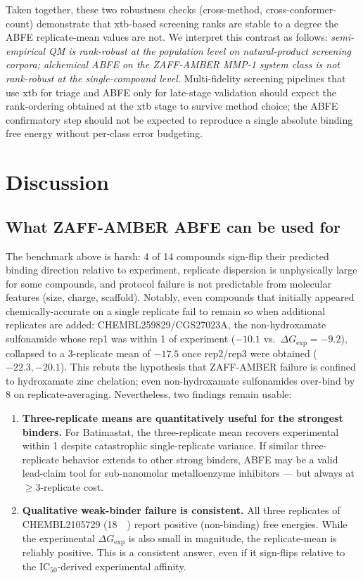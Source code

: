 \documentclass[11pt,a4paper]{article}
\newcommand{\dG}{\Delta G}
\newcommand{\dGexp}{\dG_{\mathrm{exp}}}
\newcommand{\kcalmol}{\mathrm{kcal\,mol^{-1}}}
\begin{document}
Taken together, these two robustness checks (cross-method, cross-conformer-count)
demonstrate that xtb-based screening ranks are stable to a degree the
ABFE replicate-mean values are not. We interpret this contrast as
follows: \emph{semi-empirical QM is rank-robust at the population
level on natural-product screening corpora; alchemical ABFE on the
ZAFF-AMBER MMP-1 system class is not rank-robust at the single-compound
level.} Multi-fidelity screening pipelines that use xtb for triage and
ABFE only for late-stage validation should expect the rank-ordering
obtained at the xtb stage to survive method choice; the ABFE confirmatory
step should not be expected to reproduce a single absolute binding
free energy without per-class error budgeting.

\section{Discussion}
\label{sec:discussion}

\subsection{What ZAFF-AMBER ABFE can be used for}

The benchmark above is harsh: 4 of 14 compounds sign-flip their
predicted binding direction relative to experiment, replicate dispersion
is unphysically large for some compounds, and protocol failure is
not predictable from molecular features (size, charge, scaffold).
Notably, even compounds that initially appeared chemically-accurate
on a single replicate fail to remain so when additional replicates
are added: CHEMBL259829/CGS27023A, the non-hydroxamate sulfonamide
whose rep1 was within \SI{1}{\kcalmol} of experiment
($-10.1$ vs.\ $\dGexp = -9.2$), collapsed to a 3-replicate mean of
$-17.5$ once rep2/rep3 were obtained ($-22.3, -20.1$). This rebuts
the hypothesis that ZAFF-AMBER failure is confined to hydroxamate
zinc chelation; even non-hydroxamate sulfonamides over-bind by
\SI{8}{\kcalmol} on replicate-averaging. Nevertheless, two findings
remain usable:

\begin{enumerate}[leftmargin=*]
  \item \textbf{Three-replicate means are quantitatively useful for the
    strongest binders.} For Batimastat, the three-replicate mean
    recovers experimental within \SI{1}{\kcalmol} despite catastrophic
    single-replicate variance. If similar three-replicate behavior
    extends to other strong binders, ABFE may be a valid lead-claim
    tool for sub-nanomolar metalloenzyme inhibitors --- but always at
    $\geq 3$-replicate cost.
  \item \textbf{Qualitative weak-binder failure is consistent.} All
    three replicates of CHEMBL2105729 (\SI{18}{\micro\Molar}) report
    positive (non-binding) free energies. While the experimental
    $\dGexp$ is also small in magnitude, the replicate-mean
    is reliably positive. This is a consistent answer, even if it
    sign-flips relative to the IC$_{50}$-derived experimental
    affinity.
\end{enumerate}
\end{document}
